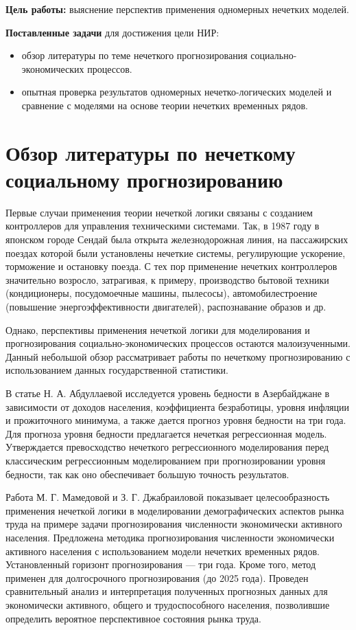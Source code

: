 \documentclass[a4paper,14pt]{article}
\begin{document}
\textbf{Цель работы:} выяснение перспектив применения одномерных нечетких моделей.

\textbf{Поставленные задачи} для достижения цели НИР:
\begin{itemize}
	\item обзор литературы по теме нечеткого прогнозирования социально-экономических процессов.
	\item опытная проверка результатов одномерных нечетко-логических моделей и сравнение с	моделями на основе теории нечетких временных рядов.
\end{itemize} 



\newpage
\section{Обзор литературы по нечеткому социальному прогнозированию}

Первые случаи применения теории нечеткой логики связаны с созданием контроллеров для управления техническими системами. Так, в 1987 году в японском городе Сендай была открыта железнодорожная линия, на пассажирских поездах которой были установлены нечеткие системы, регулирующие ускорение, торможение и остановку поезда. С тех пор применение нечетких контроллеров значительно возросло, затрагивая, к примеру, производство бытовой техники (кондиционеры, посудомоечные машины, пылесосы), автомобилестроение (повышение энергоэффективности двигателей), распознавание образов и др.

Однако, перспективы применения нечеткой логики для моделирования и прогнозирования социально-экономических процессов остаются малоизученными. Данный небольшой обзор рассматривает работы по нечеткому прогнозированию с использованием данных государственной статистики. 

В статье  Н. А. Абдуллаевой \cite{Abdullaeva2010} исследуется уровень бедности в Азербайджане в зависимости от доходов населения, коэффициента безработицы, уровня
инфляции и прожиточного минимума, а также дается прогноз
уровня бедности на три года. Для прогноза уровня бедности предлагается нечеткая регрессионная модель. Утверждается превосходство нечеткого регрессионного моделирования перед классическим регрессионным моделированием при прогнозировании уровня бедности, так как оно обеспечивает большую точность результатов. 

Работа М. Г. Мамедовой и З. Г. Джабраиловой \cite{Mamedova2005} 
показывает целесообразность применения нечеткой логики в моделировании демографических аспектов рынка труда на примере задачи прогнозирования численности экономически активного населения. Предложена методика прогнозирования численности экономически активного населения с
использованием модели нечетких временных рядов. Установленный горизонт прогнозирования --- три года. Кроме того, метод применен для долгосрочного прогнозирования (до 2025 года). Проведен сравнительный анализ и интерпретация полученных прогнозных данных для экономически активного, общего и трудоспособного населения, позволившие определить вероятное перспективное состояния рынка труда. 
\end{document}
